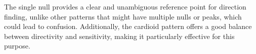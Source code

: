 The single null provides a clear and unambiguous reference point for direction finding, unlike other patterns that might have multiple nulls or peaks, which could lead to confusion. Additionally, the cardioid pattern offers a good balance between directivity and sensitivity, making it particularly effective for this purpose.

